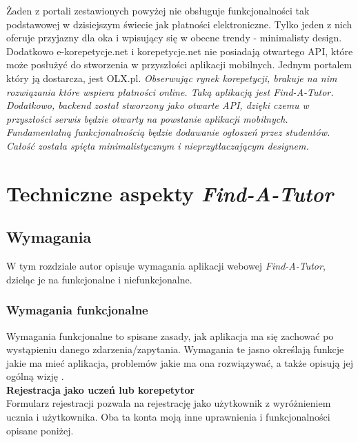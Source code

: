 \documentclass[12pt]{article}
\numberwithin{figure}{section}
\begin{document}
\begin{sloppypar}
Żaden z portali zestawionych powyżej nie obsługuje funkcjonalności tak podstawowej w dzisiejszym świecie jak płatności elektroniczne. Tylko jeden z nich oferuje przyjazny dla oka i wpisujący się w obecne trendy - minimalisty design. Dodatkowo e-korepetycje.net i korepetycje.net nie posiadają otwartego API, które może posłużyć do stworzenia w przyszłości aplikacji mobilnych. Jednym portalem który ją dostarcza, jest OLX.pl.
\newline
\newline
\textit{Obserwując rynek korepetycji, brakuje na nim rozwiązania które wspiera płatności online. Taką aplikacją jest Find-A-Tutor. Dodatkowo, backend został stworzony jako otwarte API, dzięki czemu w przyszłości serwis będzie otwarty na powstanie aplikacji mobilnych. Fundamentalną funkcjonalnością będzie dodawanie ogłoszeń przez studentów. Całość została spięta minimalistycznym i nieprzytłaczającym designem.}

\section{Techniczne aspekty \textit{Find-A-Tutor}} \label{tech-aspect}

\subsection{Wymagania}
W tym rozdziale autor opisuje wymagania aplikacji webowej \textit{Find-A-Tutor}, dzieląc je na funkcjonalne i niefunkcjonalne. 

\subsubsection{Wymagania funkcjonalne}
Wymagania funkcjonalne to spisane zasady, jak aplikacja ma się zachować po wystąpieniu danego zdarzenia/zapytania. Wymagania te jasno określają funkcje jakie ma mieć aplikacja, problemów jakie ma ona rozwiązywać, a także opisują jej ogólną wizję \cite{funkcjonalne}. \\
\noindent
\textbf{Rejestracja jako uczeń lub korepetytor}\\
\indent
Formularz rejestracji pozwala na rejestrację jako użytkownik z wyróżnieniem ucznia i użytkownika. Oba ta konta moją inne uprawnienia i funkcjonalności opisane poniżej.


\end{sloppypar}
\end{document}
